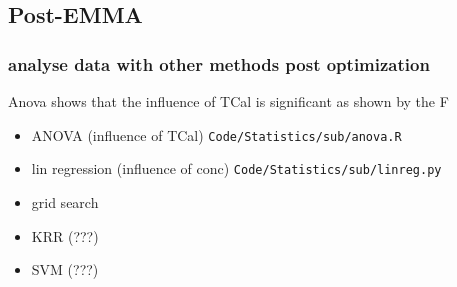 \subsection{Post-EMMA}
\subsubsection{analyse data with other methods post optimization}
Anova shows that the influence of TCal is significant as shown by the F 
\begin{itemize}
    \item ANOVA (influence of TCal) \texttt{Code/Statistics/sub/anova.R}
    \item lin regression (influence of conc) \texttt{Code/Statistics/sub/linreg.py}
    \item grid search 
    \item KRR (???)
    \item SVM (???)
\end{itemize}

